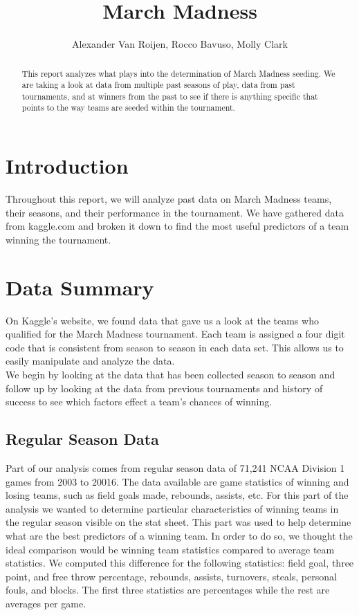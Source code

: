 \documentclass[]{scrartcl}
\title{March Madness}
\author{Alexander Van Roijen, Rocco Bavuso, Molly Clark}
\begin{document}
\maketitle

\begin{abstract}
\begin{center}
\noindent This report analyzes what plays into the determination of March Madness seeding. We are taking a look at data from multiple past seasons of play, data from past tournaments, and at winners from the past to see if there is anything specific that points to the way teams are seeded within the tournament.
\end{center}
\end{abstract}

\section*{Introduction}
Throughout this report, we will analyze past data on March Madness teams, their seasons, and their performance in the tournament. We have gathered data from kaggle.com and broken it down to find the most useful predictors of a team winning the tournament.

\section*{Data Summary}
On Kaggle's website, we found data that gave us a look at the teams who qualified for the March Madness tournament. Each team is assigned a four digit code that is consistent from season to season in each data set. This allows us to easily manipulate and analyze the data.\\

\noindent
We begin by looking at the data that has been collected season to season and follow up by looking at the data from previous tournaments and history of success to see which factors effect a team's chances of winning.
\subsection*{Regular Season Data}
Part of our analysis comes from regular season data of 71,241 NCAA Division 1 games from 2003 to 20016. The data available are game statistics of winning and losing teams, such as field goals made, rebounds, assists, etc. For this part of the analysis we wanted to determine particular characteristics of winning teams in the regular season visible on the stat sheet. This part was used to help determine what are the best predictors of a winning team. In order to do so, we thought the ideal comparison would be winning team statistics compared to average team statistics. We computed this difference for the following statistics: field goal, three point, and free throw percentage, rebounds, assists, turnovers, steals, personal fouls, and blocks. The first three statistics are percentages while the rest are averages per game.
\end{document}
